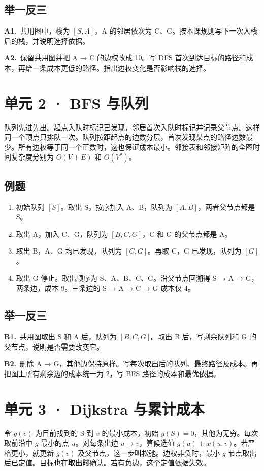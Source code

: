 \documentclass[UTF8,a4paper,11pt]{ctexart}
\newcommand{\CompactQuestion}[2]{\par\noindent\textbf{#1.}\ #2\par\vspace{.8em}}
\begin{document}
\subsection{举一反三}
\CompactQuestion{A1}{共用图中，栈为 $[S,A]$，A 的邻居依次为 C、G。按本课规则写下一次入栈后的栈，并说明选择依据。}
\CompactQuestion{A2}{保留共用图并把 A → C 的边权改成 10。写 DFS 首次到达目标的路径和成本，再给一条成本更低的路径。指出边权变化是否影响栈的选择。}
\clearpage
\section{单元 2 · BFS 与队列}
队列先进先出。起点入队时标记已发现，邻居首次入队时标记并记录父节点。这样同一个顶点只排队一次。队列按距起点的边数分层，首次发现某点的路径边数最少。所有边权等于同一个正数时，这也保证成本最小。邻接表和邻接矩阵的全图时间复杂度分别为 $O(V+E)$ 和 $O(V^2)$。

\subsection{例题}
\begin{enumerate}
\item 初始队列 $[S]$。取出 S，按序加入 A、B，队列为 $[A,B]$，两者父节点都是 S。
\item 取出 A，加入 C、G，队列为 $[B,C,G]$，C 和 G 的父节点都是 A。
\item 取出 B，A、G 均已发现，队列为 $[C,G]$。再取 C，G 已发现，队列为 $[G]$。
\item 取出 G 停止。取出顺序为 S、A、B、C、G。沿父节点回溯得 S → A → G，两条边，成本 9。三条边的 S → A → C → G 成本仅 4。
\end{enumerate}
\subsection{举一反三}
\CompactQuestion{B1}{共用图取出 S 和 A 后，队列为 $[B,C,G]$。取出 B 后，写剩余队列和 G 的父节点，说明是否需要改变它。}
\CompactQuestion{B2}{删除 A → G，其他边保持原样。写每次取出后的队列、最终路径及成本。再把图上所有剩余边的成本统一为 2，写 BFS 路径的成本和最优依据。}
\clearpage
\section{单元 3 · Dijkstra 与累计成本}
令 $g(v)$ 为目前找到的 S 到 $v$ 的最小成本，初始 $g(S)=0$，其他为无穷。每次取前沿中 $g$ 最小的点 $u$。对每条出边 $u\to v$，算候选值 $g(u)+w(u,v)$。若严格更小，就更新 $g(v)$ 及父节点，这一步叫松弛。边权非负时，最小 $g$ 节点取出后已定值。目标也在\textbf{取出时}确认。若有负边，这个定值依据失效。
\end{document}
